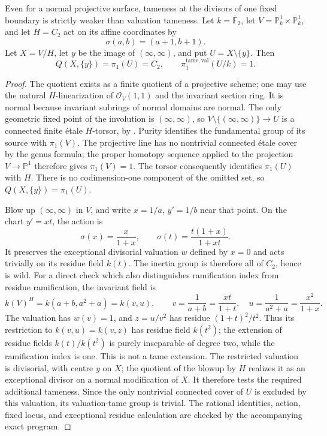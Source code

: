 \begin{example}
\label{D:fixed-vs-valuation}
Even for a normal projective surface, tameness at the divisors of one
fixed boundary is strictly weaker than valuation tameness. Let
$k=\overline{\mathbb F}_2$, let $V=\mathbb P^1_k\times\mathbb P^1_k$,
and let $H=C_2$ act on its affine coordinates by
\[
 \sigma(a,b)=(a+1,b+1).
\]
Let $X=V/H$, let $y$ be the image of $(\infty,\infty)$, and put
$U=X\setminus\{y\}$. Then
\[
 Q(X,\{y\})=\pi_1(U)=C_2,
 \qquad \pi_1^{\mathrm{tame,val}}(U/k)=1.
\]
\end{example}
\begin{proof}
The quotient exists as a finite quotient of a projective scheme;
one may use the natural $H$-linearization of $\mathcal O_V(1,1)$
and the invariant section ring. It is normal because invariant
subrings of normal domains are normal. The only geometric fixed
point of the involution is $(\infty,\infty)$, so
$V\setminus\{(\infty,\infty)\}\to U$ is a connected finite
\'etale $H$-torsor, by \cite[V, Corollary 2.3 and Proposition 2.6,
pp. 113--115]{SGA1}. Purity identifies the fundamental group of its
source with $\pi_1(V)$. The projective line has no nontrivial
connected \'etale cover by the genus formula; the proper homotopy
sequence \cite[X, Corollary 1.4, p. 263]{SGA1} applied to the
projection $V\to\mathbb P^1$ therefore gives $\pi_1(V)=1$.
The torsor consequently identifies $\pi_1(U)$ with $H$.
There is no codimension-one component of the omitted set, so
$Q(X,\{y\})=\pi_1(U)$.

Blow up $(\infty,\infty)$ in $V$, and write $x=1/a$, $y'=1/b$
near that point. On the chart $y'=xt$, the action is
\[
 \sigma(x)=\frac{x}{1+x},\qquad
 \sigma(t)=\frac{t(1+x)}{1+xt}.
\]
It preserves the exceptional divisorial valuation $w$ defined by
$x=0$ and acts trivially on its residue field $k(t)$. The inertia
group is therefore all of $C_2$, hence is wild. For a direct check
which also distinguishes ramification index from residue ramification,
the invariant field is
\[
 k(V)^H=k(a+b,a^2+a)=k(v,u),\qquad
 v=\frac{1}{a+b}=\frac{xt}{1+t},\quad
 u=\frac{1}{a^2+a}=\frac{x^2}{1+x}.
\]
The valuation has $w(v)=1$, and $z=u/v^2$ has residue
$(1+t)^2/t^2$. Thus its restriction to $k(v,u)=k(v,z)$ has
residue field $k(t^2)$; the extension of residue fields
$k(t)/k(t^2)$ is purely inseparable of degree two, while the
ramification index is one. This is not a tame extension.
The restricted valuation is divisorial, with centre $y$ on $X$;
the quotient of the blowup by $H$ realizes it as an exceptional
divisor on a normal modification of $X$.
It therefore tests the required additional tameness. Since the only
nontrivial connected cover of $U$
is excluded by this valuation, its valuation-tame group is trivial.
The rational identities, action, fixed locus, and exceptional
residue calculation are checked by the accompanying exact program.
\end{proof}

